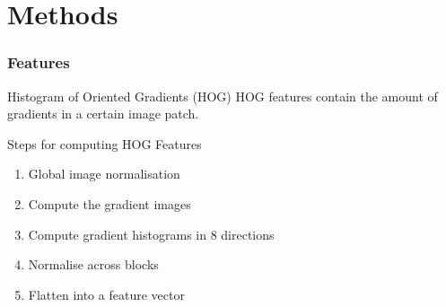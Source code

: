\documentclass{beamer}
\newcommand{\slide}[2]
{
\begin{frame}
\frametitle{#1} 

#2

\end{frame}
}
\begin{document}
\section{Methods}
\slide{Features}
{
	\begin{block}{Histogram of Oriented Gradients (HOG)}
		HOG features contain the amount of gradients in a certain image patch.
	\end{block}
	\begin{block}{Steps for computing HOG Features\cite{dalal2005histograms}}
	\begin{enumerate}
		\item Global image normalisation
		\item Compute the gradient images
		\item Compute gradient histograms in 8 directions
		\item Normalise across blocks
		\item Flatten into a feature vector
	\end{enumerate}
	\end{block}
}
\end{document}
